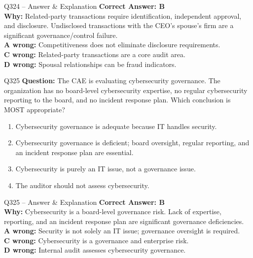\documentclass[aspectratio=169,10pt]{beamer}
\begin{document}
	\begin{frame}[t]{Q324 -- Answer \& Explanation}
		\small
		\textbf{Correct Answer: B} \\[4pt]
		\textbf{Why:} Related-party transactions require identification, independent approval, and disclosure. Undisclosed transactions with the CEO's spouse's firm are a significant governance/control failure. \\[4pt]
		\textbf{A wrong:} Competitiveness does not eliminate disclosure requirements. \\[2pt]
		\textbf{C wrong:} Related-party transactions are a core audit area. \\[2pt]
		\textbf{D wrong:} Spousal relationships can be fraud indicators.
	\end{frame}
	
	\begin{frame}[t]{Q325}
		\small
		\textbf{Question:} The CAE is evaluating cybersecurity governance. The organization has no board-level cybersecurity expertise, no regular cybersecurity reporting to the board, and no incident response plan. Which conclusion is MOST appropriate?
		\begin{enumerate}[label=\Alph*.,itemsep=1pt,topsep=2pt]
			\item Cybersecurity governance is adequate because IT handles security.
			\item Cybersecurity governance is deficient; board oversight, regular reporting, and an incident response plan are essential.
			\item Cybersecurity is purely an IT issue, not a governance issue.
			\item The auditor should not assess cybersecurity.
		\end{enumerate}
	\end{frame}
	
	\begin{frame}[t]{Q325 -- Answer \& Explanation}
		\small
		\textbf{Correct Answer: B} \\[4pt]
		\textbf{Why:} Cybersecurity is a board-level governance risk. Lack of expertise, reporting, and an incident response plan are significant governance deficiencies. \\[4pt]
		\textbf{A wrong:} Security is not solely an IT issue; governance oversight is required. \\[2pt]
		\textbf{C wrong:} Cybersecurity is a governance and enterprise risk. \\[2pt]
		\textbf{D wrong:} Internal audit assesses cybersecurity governance.
	\end{frame}
	
\end{document}
